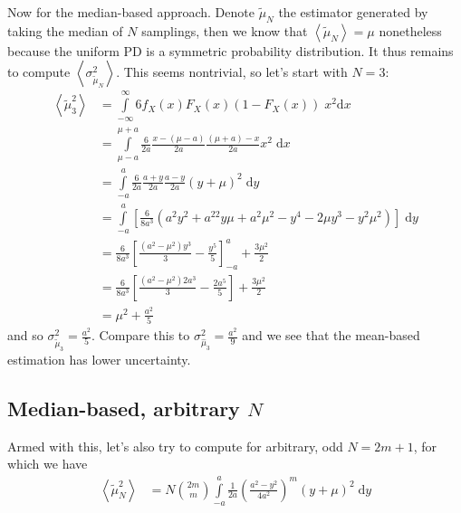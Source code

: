 \documentclass[12pt]{report}
\newcommand{\expvalue}[1]{\left<#1\right>}
\begin{document}
Now for the median-based approach. Denote $\tilde{\mu}_N$ the estimator
generated by taking the median of $N$ samplings, then we know that
$\expvalue{\tilde{\mu}_N} = \mu$ nonetheless because the uniform PD is a
symmetric probability distribution. It thus remains to compute
$\expvalue{\sigma^2_{\tilde{\mu}_N}}$. This seems nontrivial, so let's start
with $N=3$:
\begin{align}
    \expvalue{\tilde{\mu}_3^2} &= \int\limits_{-\infty}^{\infty}
        6f_X(x)F_X(x)\left( 1 - F_X(x) \right)\;x^2 \mathrm{d}x\\
        &= \int\limits_{\mu-a}^{\mu+a}
            \frac{6}{2a}\frac{x - (\mu - a)}{2a}\frac{(\mu + a) - x}{2a}x^2
            \;\mathrm{d}x\\
        &= \int\limits_{-a}^{a}\frac{6}{2a}\frac{a + y}{2a}\frac{a - y}{2a}
            (y + \mu)^2\;\mathrm{d}y\\
        &= \int\limits_{-a}^a\left[
                \frac{6}{8a^3}\left(
                    a^2y^2 + a^22y\mu + a^2\mu^2 - y^4 - 2\mu y^3 - y^2\mu^2
                \right)
            \right]\;\mathrm{d}y\\
        &= \frac{6}{8a^3}\left[
                \frac{(a^2 - \mu^2)y^3}{3} - \frac{y^5}{5}
            \right]_{-a}^a + \frac{3\mu^2}{2}\\
        &= \frac{6}{8a^3}\left[
            \frac{\left(
                a^2 - \mu^2
            \right) 2a^3}{3} - \frac{2a^5}{5}
        \right] + \frac{3\mu^2}{2}\\
        &= \mu^2 + \frac{a^2}{5}
\end{align}
and so $\sigma_{\tilde{\mu}_3}^2 = \frac{a^2}{5}$. Compare this to
$\sigma_{\hat{\mu}_3}^2 = \frac{a^2}{9}$ and we see that the mean-based
estimation has lower uncertainty.

\subsection{Median-based, arbitrary $N$}

Armed with this, let's also try to compute for arbitrary, odd $N=2m+1$, for which we
have
\begin{align}
    \expvalue{\tilde{\mu}_N^2}
        &=
            N\binom{2m}{m}\int\limits_{-a}^{a}\frac{1}{2a}
                \left( \frac{a^2 - y^2}{4a^2} \right)^m(y+\mu)^2
            \;\mathrm{d}y
\end{align}
\end{document}
